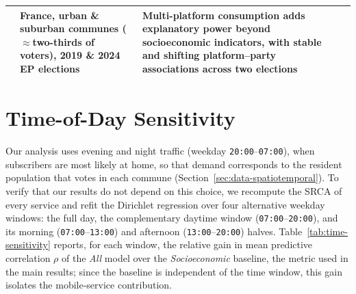 \documentclass[9pt,sigconf,letterpaper]{acmart}
\newcommand{\socioeconomic}{\emph{Socioeconomic}\xspace}
\newcommand{\all}{\emph{All}\xspace}
\begin{document}
\begin{table}[p]
{\begin{minipage}{\textheight}
\begin{tabular}{>{\raggedright\arraybackslash}p{2.7cm} >{\raggedright\arraybackslash}p{3.9cm} >{\raggedright\arraybackslash}p{5.3cm} >{\raggedright\arraybackslash}p{3.6cm} >{\raggedright\arraybackslash}p{5.1cm}}
  & \textbf{France, urban \& suburban communes (${\approx}$two-thirds of voters), 2019 \& 2024 EP elections}
  & \textbf{Multi-platform consumption adds explanatory power beyond socioeconomic indicators, with stable and shifting platform--party associations across two elections} \\
\bottomrule
\end{tabular}
\label{tab:polisci}
\end{minipage}}
\vspace*{\fill}
\end{table}

\section{Time-of-Day Sensitivity}
\label{app:time-sensitivity}

Our analysis uses evening and night traffic (weekday \texttt{20:00}--\texttt{07:00}), when subscribers are most likely at home, so that demand corresponds to the resident population that votes in each commune (Section~\ref{sec:data-spatiotemporal}).
To verify that our results do not depend on this choice, we recompute the \ac{SRCA} of every service and refit the Dirichlet regression over four alternative weekday windows: the full day, the complementary daytime window (\texttt{07:00}--\texttt{20:00}), and its morning (\texttt{07:00}--\texttt{13:00}) and afternoon (\texttt{13:00}--\texttt{20:00}) halves.
Table~\ref{tab:time-sensitivity} reports, for each window, the relative gain in mean predictive correlation $\rho$ of the \all model over the \socioeconomic baseline, the metric used in the main results; since the baseline is independent of the time window, this gain isolates the mobile-service contribution.
\end{document}
